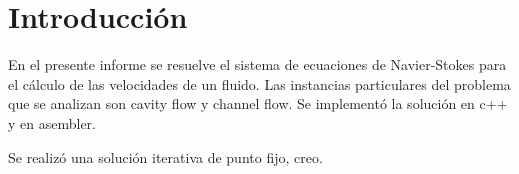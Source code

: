 \section{Introducción}%

En el presente informe se resuelve el sistema de ecuaciones de Navier-Stokes para el cálculo de las velocidades de un fluido. Las instancias particulares del problema que se analizan son cavity flow y channel flow. Se implementó la solución en c++ y en asembler.

Se realizó una solución iterativa de punto fijo, creo.

